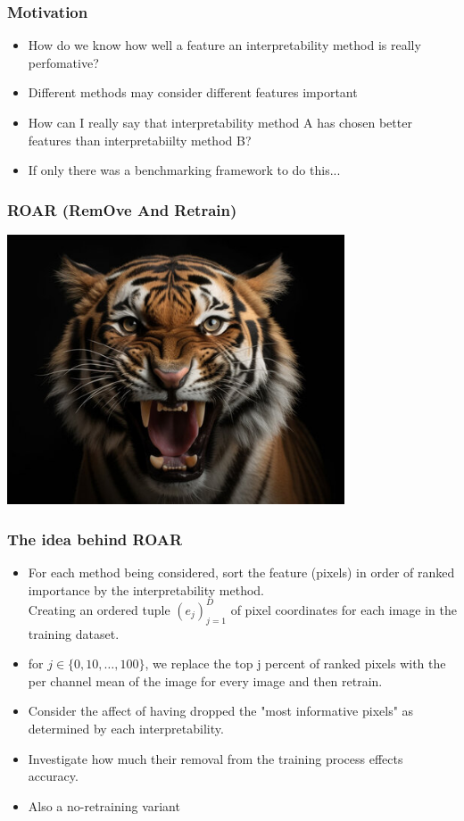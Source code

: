 \documentclass{beamer}
\theoremstyle{mystyle}
\begin{document}
\begin{frame}
	\frametitle{Motivation}
	\begin{itemize}
		\item How do we know how well a feature an interpretability method is really perfomative? \pause
		\item Different methods may consider different features important \pause
		\item How can I really say that interpretability method A has chosen better features than interpretabiilty method B?
		\item If only there was a benchmarking framework to do this...
	\end{itemize}
\end{frame}
\begin{frame}
	\frametitle{ROAR (RemOve And Retrain)}
	\includegraphics[height=8cm, width=10cm]{tiger.png}
\end{frame}
\begin{frame}
	\frametitle{The idea behind ROAR}
	\begin{itemize}
		\item For each method being considered, sort the feature (pixels) in order of ranked importance by the interpretability method. \\ Creating an ordered tuple $(e_j)_{j=1}^{D}$ of pixel coordinates for each image in the training dataset.
		\item for $j \in \{0, 10, \ldots,100\} $, we replace the top j percent of ranked pixels with the per channel mean of the image for every image and then retrain.
		\item Consider the affect of having dropped the "most informative pixels" as determined by each interpretability.
		\item Investigate how much their removal from the training process effects accuracy.		\item Also a no-retraining variant


	\end{itemize}
\end{frame}
\end{document}
